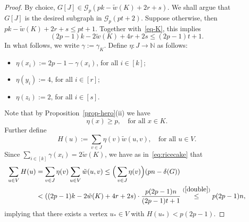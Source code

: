 \documentclass[10pt,a4paper]{amsart}
\begin{document}
\begin{proof}
	By choice, $G[J] \in \mathcal{G}_p(pk-\tilde{w}(K)+2r+s)$.
	We shall argue that $G[J]$ is the desired subgraph in $\mathcal{G}_p(pt+2)$. Suppose otherwise, then
	$pk-\tilde{w}(K)+2r+s \leq pt+1$.
	Together with~\eqref{eq-K}, this implies
	\begin{equation}\label{double}
		(2p-1)k - 2\tilde{w}(K) + 4r+2s \leq (2p-1)t+1.
	\end{equation}
	In what follows, we write $\gamma := \gamma_K$. Define $\eta: J\rightarrow \mathbb{N}$ as follows:
	\begin{itemize}
		\item $\eta(x_i) := 2p-1-\gamma(x_i)$, for all $i \in [k]$;
		\item $\eta(y_i) := 4$, for all $i \in [r]$;
		\item $\eta(z_i) := 2$, for all $i \in [s]$.
	\end{itemize}
	Note that by Proposition~\ref{prop-hero}(ii) we have
	\begin{equation}\label{eq-etap}
	\eta(x) \geq p, \quad\text{for all }x \in K.
	\end{equation}
	Further define
	$$
	H(u) := \sum_{v \in J}\eta(v)\tilde{w}(u,v),\quad\text{for all }u \in V.
	$$
	Since $\sum_{i\in [k]}\gamma(x_i)=2\tilde{w}(K)$, we have as in~\eqref{eq:ricecake} that
	\begin{align*}
		\sum_{u \in V}H(u) &= \sum_{v \in J}\eta(v)\sum_{u \in V}\tilde{w}(u,v) \leq \Big(\sum_{v \in J}\eta(v)\Big)(pn-\delta(G))\\
		&< ((2p-1)k - 2\tilde{w}(K) + 4r+2s) \cdot \frac{p(2p-1)n}{(2p-1)t+1} \stackrel{(\ref{double})}{\leq} p(2p-1)n,
	\end{align*}
	implying that there exists a vertex $u_* \in V$ with $H(u_*) < p(2p-1)$.
	

\end{proof}
\end{document}
